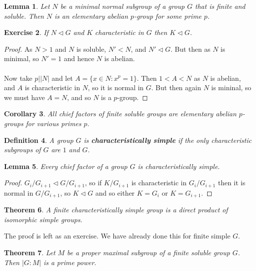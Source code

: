 \documentclass[a4paper,10pt]{article}
\newtheorem{thm}{Theorem}
\newtheorem{Def}[thm]{Definition}
\newtheorem{Cor}[thm]{Corollary}
\newtheorem{Ex}[thm]{Exercise}
\newtheorem{Lem}[thm]{Lemma}
\begin{document}
\begin{Lem}
Let $N$ be a minimal normal subgroup of a group $G$ that is finite and soluble. Then $N$ is an elementary abelian $p$-group for some prime $p$.
\end{Lem}

\begin{Ex}
If $N \triangleleft G$ and $K$ characteristic in $G$ then $K \triangleleft G$.
\end{Ex}

\begin{proof}
As $N > 1$ and $N$ is soluble, $N' < N$, and $N' \triangleleft G$. But then as $N$ is minimal, so $N' = 1$ and hence $N$ is abelian. \\
\\
Now take $p \big| |N|$ and let $A = \{ x \in N : x^p = 1 \}$. Then $1 < A < N$ as $N$ is abelian, and $A$ is characteristic in $N$, so it is normal in $G$. But then again $N$ is mininal, so we must have $A = N$, and so $N$ is a $p$-group. 
\end{proof}


\begin{Cor}
All chief factors of finite soluble groups are elementary abelian $p$-groups for various primes $p$. 
\end{Cor}

\begin{Def}
A group $G$ is \textbf{characteristically simple} if the only characteristic subgroups of $G$ are $1$ and $G$.
\end{Def}

\begin{Lem}
Every chief factor of a group $G$ is characteristically simple.
\end{Lem}

\begin{proof}
$G_i / G_{i+1} \triangleleft G / G_{i+1}$, so if $K / G_{i+1}$ is characteristic in $G_i / G_{i+1}$ then it is normal in $G / G_{i+1}$, so $K \triangleleft G$ and so either $K = G_i$ or $K = G_{i+1}$. 
\end{proof}

\begin{thm}
A finite characteristically simple group is a direct product of isomorphic simple groups.
\end{thm}
The proof is left as an exercise. We have already done this for finite simple $G$.  


\begin{thm}
Let $M$ be a proper maximal subgroup of a finite soluble group $G$.  Then $|G:M|$ is a prime power.
\end{thm}
\end{document}
